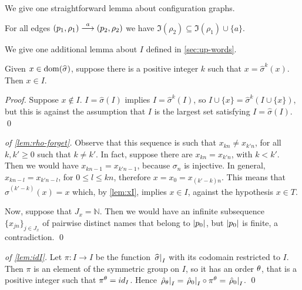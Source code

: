 %
We give one straightforward lemma about configuration graphs.
%
\begin{lemma}
\label{lem:tr-names}
For all edges $(p_1,\rho_1) \overset{a}{\longrightarrow} (p_2,\rho_2)$ we have $\Im(\rho_2) \subseteq \Im(\rho_1) \cup \{ a \}$.
\end{lemma}
%
We give one additional lemma about $I$ defined in \cref{sec:up-words}.
%
\begin{lemma}
\label{lem:xI}
Given $x \in \operatorname{dom}(\widehat{\sigma})$, suppose there is a positive integer $k$ such that $x = \widehat{\sigma}^k (x)$. Then $x \in I$.
\end{lemma}
\begin{proof}
Suppose $x \notin I$. $I = \widehat{\sigma}(I)$ implies $I = \widehat{\sigma}^k(I)$, so $I \cup \{x\} = \widehat{\sigma}^k(I \cup \{x\})$, but this is against the assumption that $I$ is the largest set satisfying $I = \widehat{\sigma}(I)$.
\qed
\end{proof}




\begin{proof}[of \cref{lem:rho-forget}]
Observe that this sequence is such that $x_{kn} \neq x_{k'n}$, for all $k,k' \geq 0$ such that $k \neq k'$. In fact, suppose there are $x_{kn} = x_{k'n}$, with $k < k'$. Then we would have $x_{kn-1} = x_{k'n-1}$, because $\sigma_{n}$ is injective. In general, $x_{kn-l} = x_{k'n-l}$, for $0 \leq l \leq kn$, therefore $x = x_0 = x_{(k'-k)n}$. This means that $\widehat{\sigma}^{(k'-k)}(x) = x$ which, by \cref{lem:xI}, implies $x \in I$, against the hypothesis $x \in T$.

Now, suppose that $J_x = \mathbb{N}$. Then we would have an infinite subsequence $\{x_{jn}\}_{j \in J_x}$ of pairwise distinct names that belong to $|p_0|$, but $|p_0|$ is finite, a contradiction.
\qed
\end{proof}


\begin{proof}[of \cref{lem:idI}]\hfill

\item Let $\pi \colon I \to I$ be the function $\left.\widehat{\sigma}\right|_{I}$ with its codomain restricted to $I$. Then $\pi$ is an element of the symmetric group on $I$, so it has an order $\theta$, that is a positive integer such that $\pi^\theta = id_I$. Hence $\left. \hat{\rho}_\theta \right|_{ I } =\left. \hat{\rho}_0 \right|_{I} \circ \pi^\theta = \left. \hat{\rho}_0 \right|_{I}$.
\qed
\end{proof}

